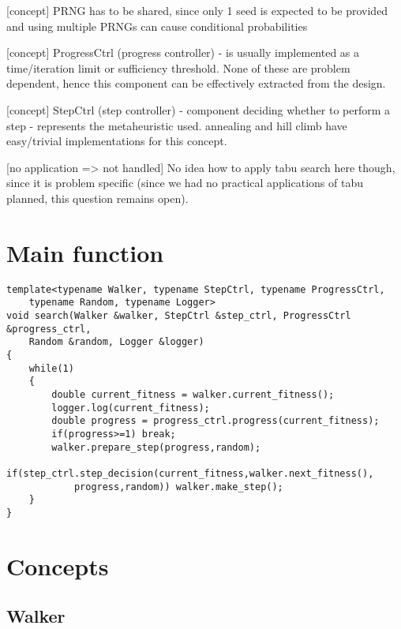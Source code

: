 [concept] PRNG has to be shared, since only 1 seed is expected to be provided and using multiple PRNGs can cause conditional probabilities

[concept] ProgressCtrl (progress controller) - is usually implemented as a time/iteration limit or sufficiency threshold.
None of these are problem dependent, hence this component can be effectively extracted from the design.

[concept] StepCtrl (step controller) - component deciding whether to perform a step - represents the metaheuristic used.
annealing and hill climb have easy/trivial implementations for this concept.

[no application => not handled] No idea how to apply tabu search here though, since it is problem specific (since we had no practical applications of tabu planned, this question remains open).


\section{Main function}

\begin{lstlisting}
template<typename Walker, typename StepCtrl, typename ProgressCtrl,
	typename Random, typename Logger>
void search(Walker &walker, StepCtrl &step_ctrl, ProgressCtrl &progress_ctrl,
	Random &random, Logger &logger)
{
	while(1)
	{
		double current_fitness = walker.current_fitness();
		logger.log(current_fitness);
		double progress = progress_ctrl.progress(current_fitness);
		if(progress>=1) break;
		walker.prepare_step(progress,random);
		if(step_ctrl.step_decision(current_fitness,walker.next_fitness(),
			progress,random)) walker.make_step();
	}
}
\end{lstlisting}

\section{Concepts}

\subsection{Walker}


